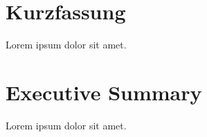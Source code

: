 \chapter*{Kurzfassung}

Lorem ipsum dolor sit amet.

\chapter*{Executive Summary}

Lorem ipsum dolor sit amet.